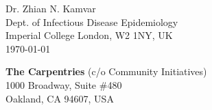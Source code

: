 


\clearpage
\begin{flushright}
  Dr. Zhian N. Kamvar\\
  Dept. of Infectious Disease Epidemiology\\
  Imperial College London, W2 1NY, UK\\
  \today
\end{flushright}

\textbf{The Carpentries}
(c/o Community Initiatives)\\
1000 Broadway, Suite \#480\\
Oakland, CA 94607, USA



